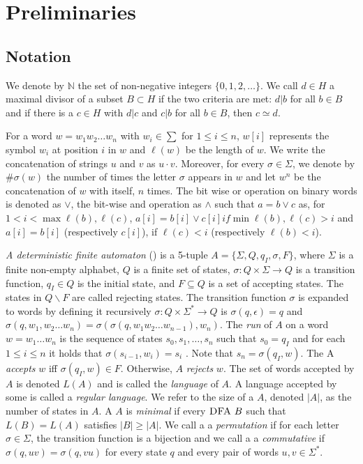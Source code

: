 \chapter{Preliminaries}
\label{ch:preliminaries}

\section{Notation}
\label{ch:prelimiaries:notation}
We denote by $\mathbb{N}$ the set of non-negative integers $\{0, 1, 2, \dots \}$. We call $d \in H$ a maximal divisor of a subset $B \subset H$ if the two criteria are met: $d|b$ for all $b \in B$ and if there is a $c \in H$ with $d|c$ and $c|b$ for all $b \in B$, then $c \simeq d$.

For a word $w = w_1 w_2 \dots w_n$ with $w_i \in \sum$ for $1 \leq i \leq n$, $w[i]$ represents the symbol $w_i$ at position $i$ in $w$ and $\ell(w)$ be the length of $w$. We write
the concatenation of strings $u$ and $v$ as $u \cdot v$. Moreover, for every $\sigma \in \Sigma$, we denote by $\#\sigma(w)$ the number of times the letter $\sigma$ appears in $w$ and let $w^n$ be the concatenation of $w$ with itself, $n$ times. The bit wise or operation on binary words is denoted as $\lor$, the bit-wise and operation as $\land$ such that $a = b \vee c$ as, for $1 < i < \max{\ell(b), \ell(c)}$, $a[i] = b[i] \vee c[i] if \min{\ell(b), \ell(c)} > i$ and  $a[i] = b[i]$ (respectively $c[i]$), if $\ell(c) < i$ (respectively $\ell(b) < i$).

\textit{A deterministic finite automaton} (\DFA) is a 5-tuple $A = \lbrace\Sigma, Q, q_I , \sigma, F\rbrace$, where $\Sigma$ is a finite non-empty alphabet, $Q$ is a finite set of states, $\sigma : Q \times \Sigma \rightarrow Q$ is a transition function, $q_I \in Q$ is the initial state, and $F \subseteq Q$ is a set of accepting states. The states in $Q \backslash F$ are called rejecting states. The transition function $\sigma$ is expanded to words by defining it recursively $\sigma : Q \times \Sigma^* \rightarrow Q$ is $\sigma(q, \epsilon) = q$ and $\sigma(q, w_1, w_2 \dots w_n ) = \sigma(\sigma(q, w_1 w_2 \dots w_{n-1} ), w_n )$. The \textit{run} of $A$ on a word $w = w_1 \dots w_n$ is the sequence of states $s_0 , s_1 , \dots , s_n$ such that $s_0 = q_I$ and for each $1 \leq i \leq n$ it holds that $\sigma(s_{i-1} , w_i ) = s_i$ . Note that $s_n = \sigma(q_I , w)$. The \DFA A \textit{accepts} $w$ iff $\sigma(q_I , w) \in F$. Otherwise, $A$ \textit{rejects} $w$. The set of words accepted by $A$ is denoted $L(A)$ and is called the \textit{language} of $A$. A language accepted by some \DFA is called a \textit{regular language}. We refer to the size of a \DFA $A$, denoted $|A|$, as the number of states in $A$. A \DFA $A$ is \textit{minimal} if every $\textsc{DFA}~B$ such that $L(B) = L(A)$ satisfies $|B| \geq |A|$. We call a \DFA a \textit{permutation \DFA} if for each letter $\sigma \in \Sigma$, the transition function is a bijection and we call a \DFA a \textit{commutative \DFA} if $\sigma(q, uv) = \sigma(q, vu)$ for every state $q$ and every pair of words $u, v \in \Sigma^*$.

